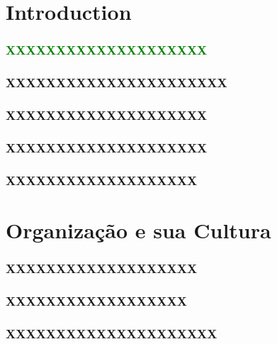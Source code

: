 

\section{Introduction}
\begin{frame}
\frametitle{\textcolor{green}{XXXXXXXXXXXXXXXXXXXX}}
\end{frame}
\begin{frame}
\frametitle{XXXXXXXXXXXXXXXXXXXXXX}
\end{frame}
\begin{frame}
\frametitle{XXXXXXXXXXXXXXXXXXXX}
\end{frame}
\begin{frame}
\frametitle{XXXXXXXXXXXXXXXXXXXX}
\end{frame}
\begin{frame}
\frametitle{XXXXXXXXXXXXXXXXXXX}
\end{frame}
\section{Organização e sua Cultura}
\begin{frame}
\frametitle{XXXXXXXXXXXXXXXXXXX}
\end{frame}
\begin{frame}
\frametitle{XXXXXXXXXXXXXXXXXX}
\end{frame}
\begin{frame}
\frametitle{XXXXXXXXXXXXXXXXXXXXX}
\end{frame}
